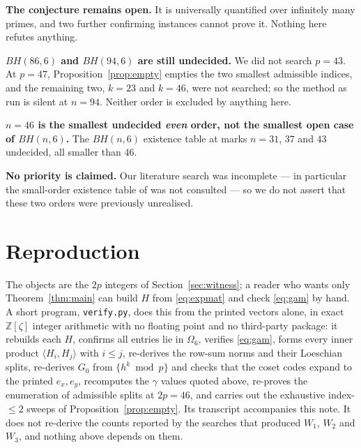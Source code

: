 \documentclass[11pt]{amsart}
\theoremstyle{remark}
\newcommand{\zzz}{\zeta}
\newcommand{\Om}{\Omega}
\begin{document}
\noindent\textbf{The conjecture remains open.} It is universally quantified
over infinitely many primes, and two further confirming instances cannot
prove it. Nothing here refutes anything.

\medskip
\noindent\textbf{$BH(86,6)$ and $BH(94,6)$ are still undecided.} We did not
search $p=43$. At $p=47$, Proposition~\ref{prop:empty} empties the two
smallest admissible indices, and the remaining two, $k=23$ and $k=46$, were
not searched; so the method as run is silent at $n=94$. Neither order is
excluded by anything here.

\medskip
\noindent\textbf{$n=46$ is the smallest undecided \emph{even} order, not the
smallest open case of $BH(n,6)$.} The $BH(n,6)$ existence table at
\cite[p.~111]{NP} marks $n=31$, $37$ and $43$ undecided, all smaller than
$46$.

\medskip
\noindent\textbf{No priority is claimed.} Our literature search was
incomplete --- in particular the small-order existence table of \cite{Egan}
was not consulted --- so we do not assert that these two orders were
previously unrealised.

\section{Reproduction}

The objects are the $2p$ integers of Section~\ref{sec:witness}; a reader who
wants only Theorem~\ref{thm:main} can build $H$ from \eqref{eq:expmat} and
check \eqref{eq:gam} by hand. A short program, \texttt{verify.py}, does this
from the printed vectors alone, in exact $\mathbb Z[\zzz]$ integer
arithmetic with no floating point and no third-party package: it rebuilds
each $H$, confirms all entries lie in $\Om_6$, verifies \eqref{eq:gam}, forms
every inner product $\langle H_i,H_j\rangle$ with $i\le j$, re-derives the
row-sum norms and their Loeschian splits, re-derives $G_0$ from
$\{h^{k}\bmod p\}$ and checks that the coset codes expand to the printed
$e_x,e_y$, recomputes the $\gamma$ values quoted above, re-proves the
enumeration of admissible splits at $2p=46$, and carries out the exhaustive
index-$\le2$ sweeps of Proposition~\ref{prop:empty}. Its transcript
accompanies this note. It does not re-derive the counts reported by the
searches that produced $W_1$, $W_2$ and $W_3$, and nothing above depends on
them.
\end{document}
